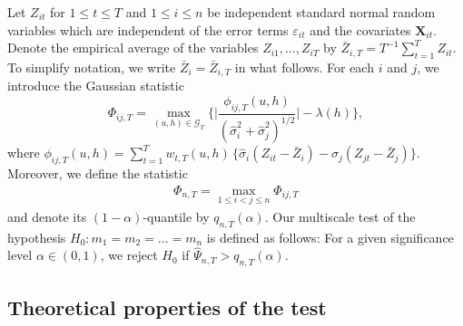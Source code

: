 \documentclass[a4paper,12pt]{article}
\begin{document}
Let $Z_{it}$ for $1 \le t \le T$ and $1 \le i \le n$ be independent standard normal random variables which are independent of the error terms $\varepsilon_{it}$ and the covariates $\mathbf{X}_{it}$. Denote the empirical average of the variables $Z_{i1},\ldots,Z_{iT}$ by $\bar{Z}_{i,T} = T^{-1} \sum_{t=1}^T Z_{it}$. To simplify notation, we write $\bar{Z}_i = \bar{Z}_{i,T}$ in what follows. For each $i$ and $j$, we introduce the Gaussian statistic 
\[\Phi_{ij,T} = \max_{(u,h) \in \mathcal{G}_T} \big\{ \Big|\frac{\phi_{ij,T}(u,h)}{(\widehat{\sigma}_i^2 + \widehat{\sigma}_j^2)^{1/2}}\Big| - \lambda(h) \Big\}, \] 
where $\phi_{ij,T}(u,h) = \sum\nolimits_{t=1}^T w_{t,T}(u,h) \, \big\{ \widehat{\sigma}_i (Z_{it} - \bar{Z}_i) - \widehat{\sigma}_j (Z_{jt} - \bar{Z}_j) \big\}$. Moreover, we define the statistic
\begin{align}\label{Phi-statistic}
\Phi_{n,T} = \max_{1 \le i < j \le n} \Phi_{ij,T}
\end{align}
and denote its $(1-\alpha)$-quantile by $q_{n,T}(\alpha)$. Our multiscale test of the hypothesis $H_0: m_1 = m_2 = \ldots = m_n$ is defined as follows: For a given significance level $\alpha \in (0,1)$, we reject $H_0$ if $\widehat{\Psi}_{n,T} > q_{n,T}(\alpha)$. 


\subsection{Theoretical properties of the test}\label{subsec-test-theo}
\end{document}

